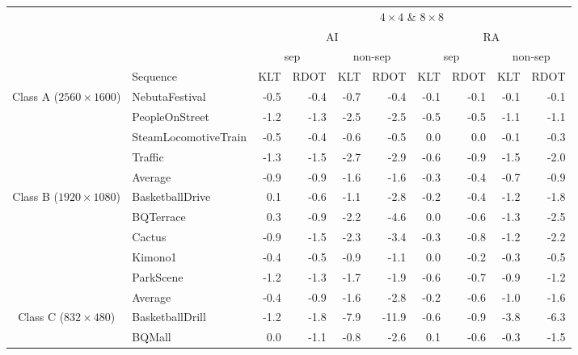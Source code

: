 \documentclass[11pt,a4paper,openright,twoside]{book}
\numberwithin{equation}{section} %
\numberwithin{figure}{section} %
\numberwithin{table}{section} %
\begin{document}
\begin{table}[tb]
	\centering
	\scriptsize
	\begin{tabularx}{\textwidth}{c|X|rr|rr|rr|rr}
		\multicolumn{2}{c}{} &
		\multicolumn{8}{c}{$4\times4$ \& $8\times8$} \\
		\cline{3-10}
		\multicolumn{2}{c}{} &
		\multicolumn{4}{c|}{AI} &
		\multicolumn{4}{c}{RA} \\
		\cline{3-10}
		\multicolumn{2}{c}{} &
		\multicolumn{2}{c|}{sep} &
		\multicolumn{2}{c|}{non-sep} &
		\multicolumn{2}{c|}{sep} &
		\multicolumn{2}{c}{non-sep} \\
		\cline{2-10}
		\multicolumn{1}{c}{} & {Sequence} &
		{KLT} & {RDOT} & {KLT} & {RDOT} &
		{KLT} & {RDOT} & {KLT} & {RDOT} \\
		\hline\hline
		\multirow{5}{0.10\textwidth}{\centering Class A ($2560\times1600$)}
		& NebutaFestival       & -0.5 & -0.4 & -0.7 & -0.4  & -0.1 & -0.1 & -0.1 & -0.1 \\
		& PeopleOnStreet       & -1.2 & -1.3 & -2.5 & -2.5  & -0.5 & -0.5 & -1.1 & -1.1 \\
		& SteamLocomotiveTrain & -0.5 & -0.4 & -0.6 & -0.5  & 0.0  & 0.0  & -0.1 & -0.3 \\
		& Traffic              & -1.3 & -1.5 & -2.7 & -2.9  & -0.6 & -0.9 & -1.5 & -2.0 \\
		\cline{2-10}
		& Average              & -0.9 & -0.9 & -1.6 & -1.6  & -0.3 & -0.4 & -0.7 & -0.9 \\
		\hline\hline
		\multirow{6}{0.10\textwidth}{\centering Class B ($1920\times1080$)}
		& BasketballDrive      & 0.1  & -0.6 & -1.1 & -2.8  & -0.2 & -0.4 & -1.2 & -1.8 \\
		& BQTerrace            & 0.3  & -0.9 & -2.2 & -4.6  & 0.0  & -0.6 & -1.3 & -2.5 \\
		& Cactus               & -0.9 & -1.5 & -2.3 & -3.4  & -0.3 & -0.8 & -1.2 & -2.2 \\
		& Kimono1              & -0.4 & -0.5 & -0.9 & -1.1  & 0.0  & -0.2 & -0.3 & -0.5 \\
		& ParkScene            & -1.2 & -1.3 & -1.7 & -1.9  & -0.6 & -0.7 & -0.9 & -1.2 \\
		\cline{2-10}
		& Average              & -0.4 & -0.9 & -1.6 & -2.8  & -0.2 & -0.6 & -1.0 & -1.6 \\
		\hline\hline
		\multirow{5}{0.10\textwidth}{\centering Class C ($832\times480$)}
		& BasketballDrill      & -1.2 & -1.8 & -7.9 & -11.9 & -0.6 & -0.9 & -3.8 & -6.3 \\
		& BQMall               & 0.0  & -1.1 & -0.8 & -2.6  & 0.1  & -0.6 & -0.3 & -1.5 \\

\end{tabularx}
\end{table}
\end{document}
